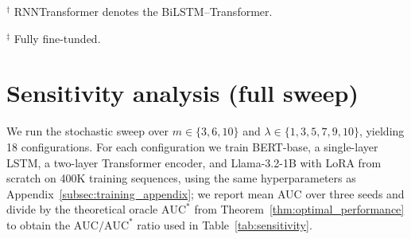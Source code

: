 \documentclass{article} %
\theoremstyle{plain}
\theoremstyle{definition}
\theoremstyle{remark}
\begin{document}
\begin{table}[h!]
\begin{tabular}{@{}lcccc@{}}
\bottomrule
\end{tabular}

\par\smallskip
\begin{minipage}{\linewidth}
\footnotesize\raggedright
$^{\dagger}$ RNNTransformer denotes the BiLSTM--Transformer.\par
$^{\ddag}$ Fully fine-tunded.
\end{minipage}
\end{table}

\FloatBarrier
\section{Sensitivity analysis (full sweep)}
\label{app:sensitivity}

We run the stochastic sweep over
\(m\in\{3,6,10\}\) and \(\lambda\in\{1,3,5,7,9,10\}\), yielding 18
configurations. For each configuration we train BERT-base, a single-layer LSTM, a two-layer Transformer encoder, and Llama-3.2-1B with LoRA from scratch on 400K training sequences, using the same hyperparameters as Appendix~\ref{subsec:training_appendix}; we report mean AUC over three seeds and divide by the theoretical oracle $\mathrm{AUC}^{*}$ from Theorem~\ref{thm:optimal_performance} to obtain the $\mathrm{AUC}/\mathrm{AUC}^{*}$ ratio used in Table~\ref{tab:sensitivity}.
\end{document}
